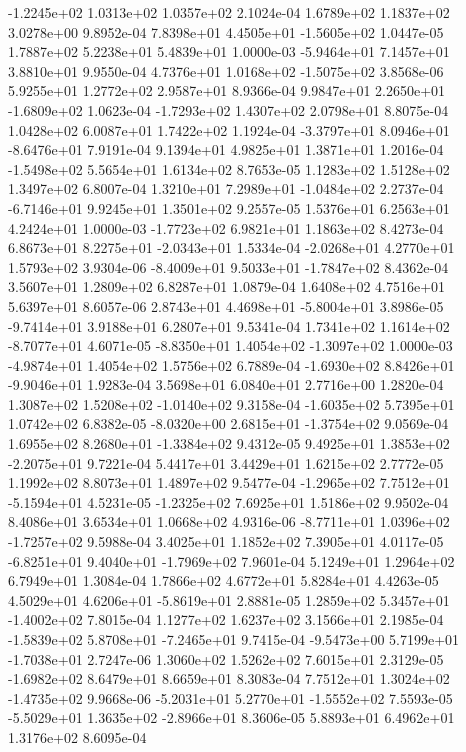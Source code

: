 -1.2245e+02  1.0313e+02  1.0357e+02  2.1024e-04
1.6789e+02 1.1837e+02 3.0278e+00  9.8952e-04
 7.8398e+01  4.4505e+01 -1.5605e+02  1.0447e-05
1.7887e+02 5.2238e+01 5.4839e+01  1.0000e-03
-5.9464e+01  7.1457e+01  3.8810e+01  9.9550e-04
 4.7376e+01  1.0168e+02 -1.5075e+02  3.8568e-06
5.9255e+01 1.2772e+02 2.9587e+01  8.9366e-04
 9.9847e+01  2.2650e+01 -1.6809e+02  1.0623e-04
-1.7293e+02  1.4307e+02  2.0798e+01  8.8075e-04
1.0428e+02 6.0087e+01 1.7422e+02  1.1924e-04
-3.3797e+01  8.0946e+01 -8.6476e+01  7.9191e-04
9.1394e+01 4.9825e+01 1.3871e+01  1.2016e-04
-1.5498e+02  5.5654e+01  1.6134e+02  8.7653e-05
1.1283e+02 1.5128e+02 1.3497e+02  6.8007e-04
 1.3210e+01  7.2989e+01 -1.0484e+02  2.2737e-04
-6.7146e+01  9.9245e+01  1.3501e+02  9.2557e-05
1.5376e+01 6.2563e+01 4.2424e+01  1.0000e-03
-1.7723e+02  6.9821e+01  1.1863e+02  8.4273e-04
 6.8673e+01  8.2275e+01 -2.0343e+01  1.5334e-04
-2.0268e+01  4.2770e+01  1.5793e+02  3.9304e-06
-8.4009e+01  9.5033e+01 -1.7847e+02  8.4362e-04
3.5607e+01 1.2809e+02 6.8287e+01  1.0879e-04
1.6408e+02 4.7516e+01 5.6397e+01  8.6057e-06
 2.8743e+01  4.4698e+01 -5.8004e+01  3.8986e-05
-9.7414e+01  3.9188e+01  6.2807e+01  9.5341e-04
 1.7341e+02  1.1614e+02 -8.7077e+01  4.6071e-05
-8.8350e+01  1.4054e+02 -1.3097e+02  1.0000e-03
-4.9874e+01  1.4054e+02  1.5756e+02  6.7889e-04
-1.6930e+02  8.8426e+01 -9.9046e+01  1.9283e-04
3.5698e+01 6.0840e+01 2.7716e+00  1.2820e-04
 1.3087e+02  1.5208e+02 -1.0140e+02  9.3158e-04
-1.6035e+02  5.7395e+01  1.0742e+02  6.8382e-05
-8.0320e+00  2.6815e+01 -1.3754e+02  9.0569e-04
 1.6955e+02  8.2680e+01 -1.3384e+02  9.4312e-05
 9.4925e+01  1.3853e+02 -2.2075e+01  9.7221e-04
5.4417e+01 3.4429e+01 1.6215e+02  2.7772e-05
1.1992e+02 8.8073e+01 1.4897e+02  9.5477e-04
-1.2965e+02  7.7512e+01 -5.1594e+01  4.5231e-05
-1.2325e+02  7.6925e+01  1.5186e+02  9.9502e-04
8.4086e+01 3.6534e+01 1.0668e+02  4.9316e-06
-8.7711e+01  1.0396e+02 -1.7257e+02  9.5988e-04
3.4025e+01 1.1852e+02 7.3905e+01  4.0117e-05
-6.8251e+01  9.4040e+01 -1.7969e+02  7.9601e-04
5.1249e+01 1.2964e+02 6.7949e+01  1.3084e-04
1.7866e+02 4.6772e+01 5.8284e+01  4.4263e-05
 4.5029e+01  4.6206e+01 -5.8619e+01  2.8881e-05
 1.2859e+02  5.3457e+01 -1.4002e+02  7.8015e-04
1.1277e+02 1.6237e+02 3.1566e+01  2.1985e-04
-1.5839e+02  5.8708e+01 -7.2465e+01  9.7415e-04
-9.5473e+00  5.7199e+01 -1.7038e+01  2.7247e-06
1.3060e+02 1.5262e+02 7.6015e+01  2.3129e-05
-1.6982e+02  8.6479e+01  8.6659e+01  8.3083e-04
 7.7512e+01  1.3024e+02 -1.4735e+02  9.9668e-06
-5.2031e+01  5.2770e+01 -1.5552e+02  7.5593e-05
-5.5029e+01  1.3635e+02 -2.8966e+01  8.3606e-05
5.8893e+01 6.4962e+01 1.3176e+02  8.6095e-04
